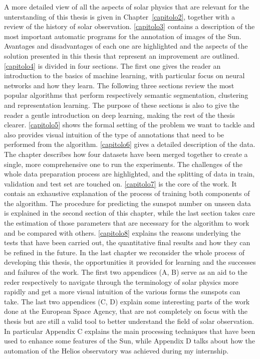 \bigbreak
\noindent A more detailed view of all the aspects of solar physics that are relevant for the unterstanding of this thesis is given in Chapter~\autoref{capitolo2}, together with a review of the history of solar observation.
\bigbreak
\noindent \autoref{capitolo3} contains a description of the most important automatic programs for the annotation of images of the Sun. Avantages and disadvantages of each one are highlighted and the aspects of the solution presented in this thesis that represent an improvement are outlined.
\bigbreak
\noindent \autoref{capitolo4} is divided in four sections. The first one gives the reader an introduction to the basics of machine learning, with particular focus on neural networks and how they learn. The following three sections review the most popular algorithms that perform respectively semantic segmentation, clustering and representation learning. The purpose of these sections is also to give the reader a gentle introduction on deep learning, making the rest of the thesis clearer.
\bigbreak
\noindent \autoref{capitolo5} shows the formal setting of the problem we want to tackle and also provides visual intuition of the type of annotations that need to be performed from the algorithm.
\bigbreak
\noindent \autoref{capitolo6} gives a detailed description of the data. The chapter describes how four datasets have been merged together to create a single, more comprehensive one to run the experiments. The challenges of the whole data preparation process are highlighted, and the splitting of data in train, validation and test set are touched on.
\bigbreak
\noindent \autoref{capitolo7} is the core of the work. It contais an exhaustive explanation of the process of training both components of the algorithm. The procedure for predicting the sunspot number on unseen data is explained in the second section of this chapter, while the last section takes care the estimation of those parameters that are necessary for the algorithm to work and be compared with others.
\bigbreak
\noindent \autoref{capitolo8} explains the reasons underlying the tests that have been carried out, the quantitative final results and how they can be refined in the future.
\bigbreak
\noindent In the last chapter we reconsider the whole process of developing this thesis, the opportunities it provided for learning and the successes and failures of the work.
\bigbreak
\noindent The first two appendices (A, B) serve as an aid to the reder respectively to navigate through the terminology of solar physics more rapidly and get a more visual intuition of the various forms the sunspots can take.
\bigbreak
\noindent The last two appendices (C, D) explain some interesting parts of the work done at the European Space Agency, that are not completely on focus with the thesis but are still a valid tool to better understand the field of solar observation. In particular Appendix C explains the main processing techniques that have been used to enhance some features of the Sun, while Appendix D talks about how the automation of the Helios observatory was achieved during my internship.
